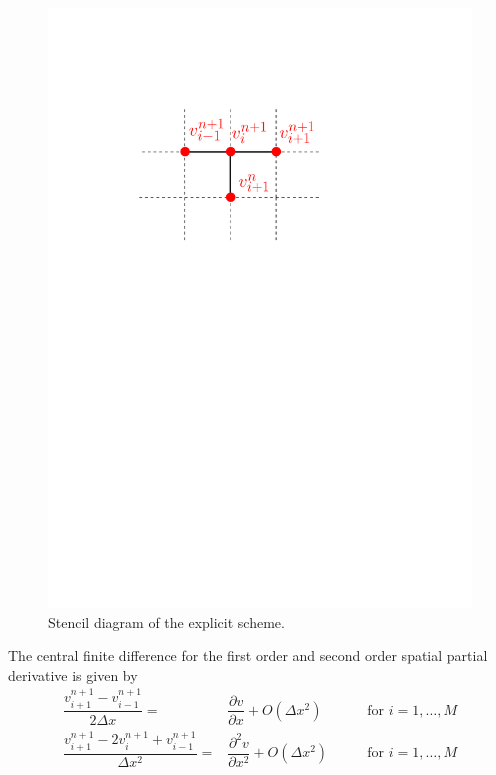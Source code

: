 \begin{figure}[H]
  \centering
  \includegraphics[scale=.8]{chapters/chapter3/ExplicitStencil.pdf}
  \caption{Stencil diagram of the explicit scheme.}
  \label{fig:finitediferencesschemes:explicit_stencil}
\end{figure}

The central finite difference for the first order and second order spatial partial derivative is given by
\begin{align}
  \label{eq:finitediferencesschemes:explicit:spatial_first_order_central_finite_difference}
  \dfrac{v^{n+1}_{i+1} - v^{n+1}_{i-1}}{2 \Delta{x}} =& \dfrac{\partial{v}}{\partial{x}}+ O(\Delta{x}^2) \qquad & \text{for $i = 1, \dots, M$} \\
  \label{eq:finitediferencesschemes:explicit:spatial_second_order_central_finite_difference}
  \dfrac{v^{n+1}_{i+1} - 2v^{n+1}_{i} + v^{n+1}_{i-1}}{\Delta{x}^2} =& \dfrac{\partial^2{v}}{\partial{x^2}}+ O(\Delta{x}^2) \qquad & \text{for $i = 1, \dots, M$}
\end{align}

